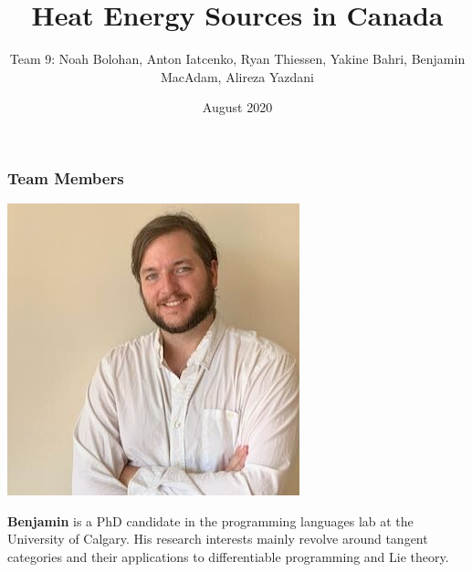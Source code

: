 \documentclass{beamer}
\title{Heat Energy Sources in Canada}
\author[Team 9]{Team 9: Noah Bolohan, Anton Iatcenko, Ryan Thiessen, Yakine Bahri, Benjamin MacAdam, Alireza Yazdani}
\institute[]{Math\textsuperscript{Industry}}
\date{August 2020}
\begin{document}
\frame{\titlepage}


\begin{frame}
\frametitle{Team Members}

\begin{minipage}[c]{0.15\textwidth}
\includegraphics[width=\textwidth, trim={25pt 0pt 0pt 0pt}, clip]{TeamPics/Ben.jpg}
\end{minipage}\hspace{0.05\textwidth}%
\begin{minipage}[c]{0.8\textwidth}
{\small \textbf{Benjamin} is a PhD candidate in the programming languages lab at the University of Calgary. His research interests mainly revolve around tangent categories and their applications to differentiable programming and Lie theory. }
\end{minipage}


\end{frame}
\end{document}

